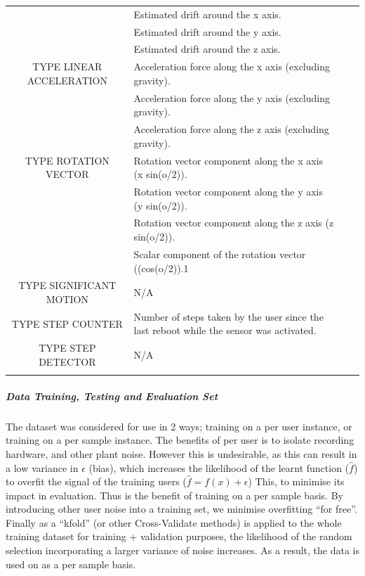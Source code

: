 \documentclass{UoNMCHA}
\newcommand{\inlineQuote}[1]{``#1''}
\numberwithin{equation}{section}
\begin{document}
\begin{table}[h!]
\begin{center}
{\begin{tabular}{c l l l|}
                  & Estimated drift around the x axis. \\
                  & Estimated drift around the y axis. \\
                  & Estimated drift around the z axis. \\
                TYPE LINEAR ACCELERATION & Acceleration force along the x axis (excluding gravity). \\
                  & Acceleration force along the y axis (excluding gravity). \\
                  & Acceleration force along the z axis (excluding gravity). \\
                TYPE ROTATION VECTOR & Rotation vector component along the x axis (x  sin(o/2)). \\
                  & Rotation vector component along the y axis (y  sin(o/2)). \\
                  & Rotation vector component along the z axis (z  sin(o/2)). \\
                  & Scalar component of the rotation vector ((cos(o/2)).1 \\
                TYPE SIGNIFICANT MOTION & N/A \\
                TYPE STEP COUNTER & Number of steps taken by the user since the last reboot while the sensor was activated. \\
                TYPE STEP DETECTOR & N/A \\
                \\ \hline
            \end{tabular}
        }
    \end{center}
\end{table}



\subparagraph{Data Training, Testing and Evaluation Set} \label{para:ExtraSensorydataset}


The dataset was considered for use in 2 ways; training on a per user instance, or training on a per sample instance. The benefits of per user is to isolate recording hardware, and other plant noise. However this is undesirable, as this can result in a low variance in $\epsilon$ (bias), which increases the likelihood  of the learnt function ($\hat{f}$) to overfit the signal of the training users ($ \hat{f} = f(x) + \epsilon$) This, to minimise its impact in evaluation. Thus is the benefit of training on a per sample basis. By introducing other user noise into a training set, we minimise overfitting \inlineQuote{for free}. Finally as a \inlineQuote{kfold} (or other Cross-Validate methods) is applied to the whole training dataset for training + validation purposes, the likelihood  of the random selection incorporating a larger variance of noise increases. As a result, the data is used on as a per sample basis.
\end{document}
